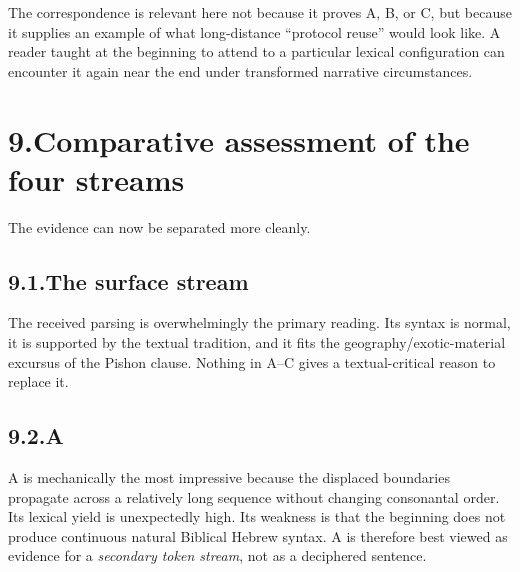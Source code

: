 The correspondence is relevant here not because it proves A, B, or C, but because it supplies an example of what long-distance ``protocol reuse'' would look like.  A reader taught at the beginning to attend to a particular lexical configuration can encounter it again near the end under transformed narrative circumstances.

\section*{9.\quad Comparative assessment of the four streams}

The evidence can now be separated more cleanly.


\subsection*{9.1.\quad The surface stream}

The received parsing is overwhelmingly the primary reading.  Its syntax is normal, it is supported by the textual tradition, and it fits the geography/exotic-material excursus of the Pishon clause.  Nothing in A--C gives a textual-critical reason to replace it.

\subsection*{9.2.\quad A}

A is mechanically the most impressive because the displaced boundaries propagate across a relatively long sequence without changing consonantal order.  Its lexical yield is unexpectedly high.  Its weakness is that the beginning does not produce continuous natural Biblical Hebrew syntax.  A is therefore best viewed as evidence for a \emph{secondary token stream}, not as a deciphered sentence.

